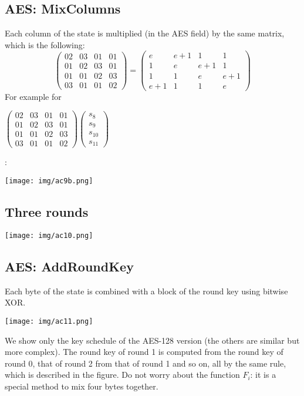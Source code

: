 \documentclass[a4paper, 10pt, titlepage]{article}
\begin{document}
\subsection{AES: MixColumns}
Each column of the state is multiplied (in the AES field) by the same
matrix, which is the following: 
$$ \left(
\begin{matrix}
02 & 03 & 01 & 01 \\
01 & 02 & 03 & 01 \\
01 & 01 & 02 & 03 \\
03 & 01 & 01 & 02 
\end{matrix} \right) = \left(
\begin{matrix}
e & e+1 & 1 & 1 \\
1 & e & e+1 & 1 \\
1 & 1 & e & e+1 \\
e+1 & 1 & 1 & e 
\end{matrix} \right)
$$
For example for \begin{footnotesize}
$\left(\begin{matrix}
02 & 03 & 01 & 01 \\
01 & 02 & 03 & 01 \\
01 & 01 & 02 & 03 \\
03 & 01 & 01 & 02 
\end{matrix}\right) \left( \begin{matrix}
s_8 \\
s_9 \\
s_{10} \\
s_{11} 
\end{matrix} \right)$
\end{footnotesize}:
\begin{center}
\texttt{[image: img/ac9b.png]}
\end{center}

\subsection*{Three rounds}
\begin{center}
\texttt{[image: img/ac10.png]}
\end{center}

\subsection{AES: AddRoundKey}
Each byte of the state is combined with a block of the round key using bitwise XOR.
\begin{center}
\centering \texttt{[image: img/ac11.png]}
\end{center}
We show only the key schedule of the AES-128 version (the others are similar but more complex).  The round key of round 1 is computed from the round key of round 0, that of round 2 from that of round 1   and so on, all by the same rule, which is described in the figure. Do not worry about the function $F_i$: it is a special method to mix four bytes together.
\end{document}
